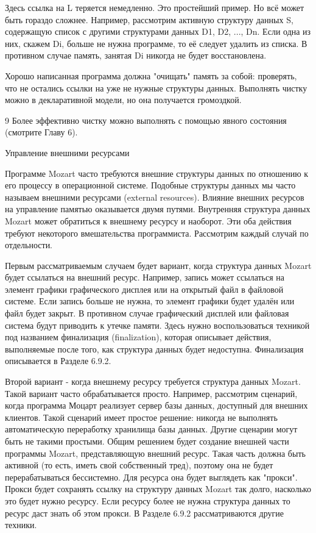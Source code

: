 Здесь ссылка на L теряется немедленно. Это простейший пример. Но всё может быть гораздо сложнее. Например, рассмотрим активную структуру данных S, содержащую список с другими структурами данных D1, D2, ..., Dn. Если одна из них, скажем Di, больше не нужна программе, то её следует удалить из списка. В противном случае память, занятая Di никогда не будет восстановлена.

Хорошо написанная программа должна "очищать" память за собой: проверять, что не остались ссылки на уже не нужные структуры данных. Выполнять чистку можно в декларативной модели, но она получается громоздкой.

9 Более эффективно чистку можно выполнять с помощью явного состояния (смотрите Главу 6).

Управление внешними ресурсами

Программе Mozart часто требуются внешние структуры данных по отношению к его процессу в операционной системе. Подобные структуры данных мы часто называем внешними ресурсами (external resources). Влияние внешних ресурсов на управление памятью оказывается двумя путями. Внутренняя структура данных Mozart может обратиться к внешнему ресурсу и наоборот. Эти оба действия требуют некоторого вмешательства программиста. Рассмотрим каждый случай по отдельности.

Первым рассматриваемым случаем будет вариант, когда структура данных Mozart будет ссылаться на внешний ресурс. Например, запись может ссылаться на элемент графики графического дисплея или на открытый файл в файловой системе. Если запись больше не нужна, то элемент графики будет удалён или файл будет закрыт. В противном случае графический дисплей или файловая система будут приводить к утечке памяти. Здесь нужно воспользоваться техникой под названием финализация (finalization), которая описывает действия, выполняемые после того, как структура данных будет недоступна. Финализация описывается в Разделе 6.9.2.

Второй вариант - когда внешнему ресурсу требуется структура данных Mozart. Такой вариант часто обрабатывается просто. Например, рассмотрим сценарий, когда программа Моцарт реализует сервер базы данных, доступный для внешних клиентов. Такой сценарий имеет простое решение: никогда не выполнять автоматическую переработку хранилища базы данных. Другие сценарии могут быть не такими простыми. Общим решением будет создание внешней части программы Mozart, представляющую внешний ресурс. Такая часть должна быть активной (то есть, иметь свой собственный тред), поэтому она не будет перерабатываться бессистемно. Для ресурса она будет выглядеть как "прокси". Прокси будет сохранять ссылку на структуру данных Mozart так долго, насколько это будет нужно ресурсу. Если ресурсу более не нужна структура данных то ресурс даст знать об этом прокси. В Разделе 6.9.2 рассматриваются другие техники.


